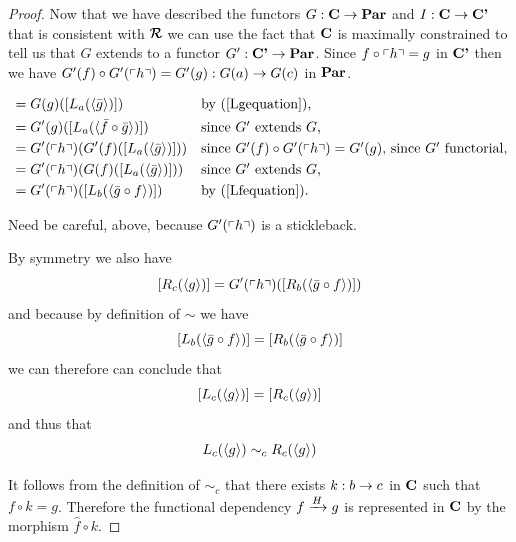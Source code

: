 \begin{proof}
Now that we have described the functors  $G: \catc \morph \Par$ and $I:\catc \morph \catcp$ that is consistent with $\reqtc$
we can use the fact that $\catc$ is maximally constrained to tell us that $G$ extends to a functor 
$G' : \catcp \morph \Par$. Since $f \circ \qq{h} = g$ in $\catcp$ then we have
 $G'(f) \circ G'(\qq{h}) = G'(g): G(a) \morph G(c)$ in $\Par$.

\begin{worktt}
\begin{align*}
[L_c(g)] 
        &= G(g)([L_a(\tuple{\bar{g}})])       
                && \mbox{by (\ref{Lgequation}),}\\
        &= G'(g)([L_a(\tuple{\bar{f}\circ \bar{g}})])      
                && \mbox{since $G'$ extends $G$,} \\
        &= G'(\qq{h}) (G'(f)([L_a(\tuple{\bar{g}})])) 
                && \mbox{since $G'(f) \circ G'(\qq{h}) = G'(g)$, since $G'$ functorial,}\\
        &= G'(\qq{h}) (G(f)([L_a(\tuple{\bar{g}})])) 
                && \mbox{since $G'$ extends $G$,}  \\
	      &= G'(\qq{h}) ([L_b(\tuple{\bar{g} \circ f})])       
                &&\mbox{by (\ref{Lfequation}).} 
\end{align*}
\end{worktt}


\begin{worktt} 
Need be careful, above, because $G'(\qq{h})$ is a stickleback.
\end{worktt}
By symmetry we also have
$$[R_c(\tuple{g})] = G'(\qq{h}) ([R_b(\tuple{\bar{g} \circ f})])  $$
and because by definition of $\sim$ we have
$$[L_b(\tuple{\bar{g} \circ f})]=[R_b(\tuple{\bar{g} \circ f})]$$
we can therefore can conclude that
$$[L_c(\tuple{g})] = [R_c(\tuple{g})]$$
and thus that
$$ L_c(\tuple{g}) \sim_c R_c(\tuple{g})$$


It follows from the definition of $\sim_c$ that there exists $k:b \morph c$ in 
$\catc$ such that 
$f \circ k = g$.  
Therefore the functional dependency $\fundep{H}{f}{g}$ 
is represented in $\catc$ 
by the morphism $\widehat{f} \circ k$.
\end{proof}